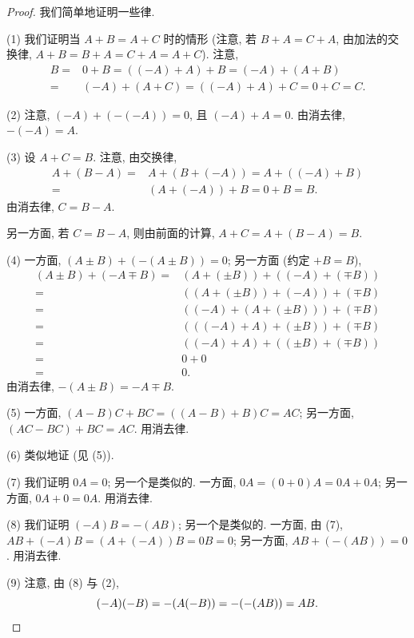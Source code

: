 \documentclass[../libro.tex]{subfiles}
\begin{document}
\begin{proof}
    我们简单地证明一些律.

    (1)
    我们证明当 \(A + B = A + C\) 时的情形
    (注意, 若 \(B + A = C + A\), 由加法的交换律,
    \(A + B = B + A = C + A = A + C\)).
    注意,
    \begin{align*}
        B
        = {} & 0 + B
        = ((-A) + A) + B
        = (-A) + (A + B)
        \\
        = {} & (-A) + (A + C)
        = ((-A) + A) + C
        = 0 + C
        = C.
    \end{align*}

    (2)
    注意, \((-A) + (-(-A)) = 0\),
    且 \((-A) + A = 0\).
    由消去律, \(-(-A) = A\).

    (3)
    设 \(A + C = B\).
    注意, 由交换律,
    \begin{align*}
        A + (B - A)
        = {} & A + (B + (-A))
        = A + ((-A) + B)
        \\
        = {} & (A + (-A)) + B
        = 0 + B
        = B.
    \end{align*}
    由消去律, \(C = B - A\).

    另一方面, 若 \(C = B - A\),
    则由前面的计算, \(A + C = A + (B - A) = B\).

    (4)
    一方面, \((A \pm B) + (-(A \pm B)) = 0\);
    另一方面 (约定 \(+B = B\)),
    \begin{align*}
        (A \pm B) + (-A \mp B)
        = {} & (A + (\pm B)) + ((-A) + (\mp B))
        \\
        = {} & ((A + (\pm B)) + (-A)) + (\mp B)
        \\
        = {} & ((-A) + (A + (\pm B))) + (\mp B)
        \\
        = {} & (((-A) + A) + (\pm B)) + (\mp B)
        \\
        = {} & ((-A) + A) + ((\pm B) + (\mp B))
        \\
        = {} & 0 + 0
        \\
        = {} & 0.
    \end{align*}
    由消去律, \(-(A \pm B) = -A \mp B\).

    (5)
    一方面,
    \((A - B) C + B C = ((A - B) + B) C = A C\);
    另一方面,
    \((A C - B C) + B C = A C\).
    用消去律.

    (6)
    类似地证 (见 (5)).

    (7)
    我们证明 \(0 A = 0\);
    另一个是类似的.
    一方面,
    \(0 A = (0 + 0) A = 0 A + 0 A\);
    另一方面,
    \(0 A + 0 = 0 A\).
    用消去律.

    (8)
    我们证明 \((-A) B = -(A B)\);
    另一个是类似的.
    一方面, 由 (7),
    \(A B + (-A) B = (A + (-A)) B = 0 B = 0\);
    另一方面,
    \(A B + (-(A B)) = 0\).
    用消去律.

    (9)
    注意, 由 (8) 与 (2),
    \begin{equation*}
        (-A) (-B) = -(A (-B)) = -(-(A B)) = A B.
        \qedhere
    \end{equation*}
\end{proof}
\end{document}
